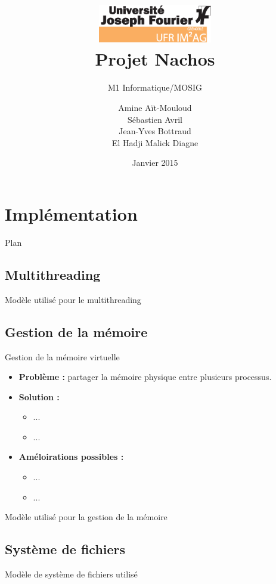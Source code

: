 \documentclass{beamer}
\title{\includegraphics[width=5cm]{LOGO_IM2AG_UJF.eps}
\\ Projet Nachos}
\subtitle{M1 Informatique/MOSIG}
\author{Amine Aït-Mouloud
\\ Sébastien Avril
\\ Jean-Yves Bottraud
\\ El Hadji Malick Diagne
}
\date{Janvier 2015}
\begin{document}
\frame{\titlepage} 

\begin{frame}
    \tableofcontents
\end{frame}

\section{Implémentation}
\begin{frame}{Plan}
    \tableofcontents[currentsection]
\end{frame}

\subsection{Multithreading}
\begin{frame}{Modèle utilisé pour le multithreading}
   
\end{frame}


\subsection{Gestion de la mémoire}
\begin{frame}{Gestion de la mémoire virtuelle}
    \begin{itemize}
        \item \textbf{Problème :} partager la mémoire physique entre plusieurs processus.
        \item \textbf{Solution :}
            \begin{itemize}
                \item ...
                \item ...
            \end{itemize}
        \item \textbf{Améloirations possibles :}
            \begin{itemize}
                \item ...
                \item ...
            \end{itemize}
    \end{itemize}
\end{frame}

\begin{frame}{Modèle utilisé pour la gestion de la mémoire}
    
\end{frame}

\subsection{Système de fichiers}
\begin{frame}{Modèle de système de fichiers utilisé}
    
\end{frame}
\end{document}
